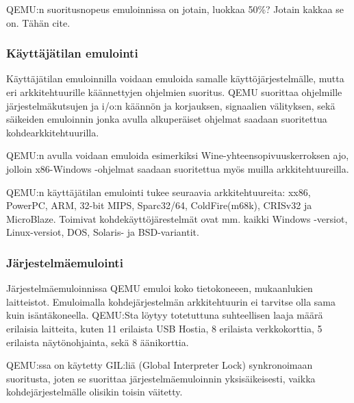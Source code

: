 QEMU:n suoritusnopeus emuloinnissa on jotain, luokkaa 50\%? Jotain kakkaa se on. Tähän cite. 

\subsubsection{Käyttäjätilan emulointi}
Käyttäjätilan emuloinnilla voidaan emuloida samalle käyttöjärjestelmälle, mutta eri arkkitehtuurille käännettyjen ohjelmien suoritus. QEMU suorittaa ohjelmille järjestelmäkutsujen ja i/o:n käännön ja korjauksen, signaalien välityksen, sekä säikeiden emuloinnin jonka avulla alkuperäiset ohjelmat saadaan suoritettua kohdearkkitehtuurilla.

QEMU:n avulla voidaan emuloida esimerkiksi Wine-yhteensopivuuskerroksen ajo, jolloin x86-Windows -ohjelmat saadaan suoritettua myös muilla arkkitehtuureilla.

QEMU:n käyttäjätilan emulointi tukee seuraavia arkkitehtuureita: xx86, PowerPC, ARM, 32-bit MIPS, Sparc32/64, ColdFire(m68k), CRISv32 ja MicroBlaze. Toimivat kohdekäyttöjärestelmät ovat mm. kaikki Windows -versiot, Linux-versiot, DOS, Solaris- ja BSD-variantit.


\subsubsection{Järjestelmäemulointi}
Järjestelmäemuloinnissa QEMU emuloi koko tietokoneeen, mukaanlukien laitteistot. Emuloimalla kohdejärjestelmän arkkitehtuurin ei tarvitse olla sama kuin isäntäkoneella. QEMU:Sta löytyy totetuttuna suhteellisen laaja määrä erilaisia laitteita, kuten 11 erilaista USB Hostia, 8 erilaista verkkokorttia, 5 erilaista näytönohjainta, sekä 8 äänikorttia.

QEMU:ssa on käytetty GIL:liä (Global Interpreter Lock) synkronoimaan suoritusta, joten se suorittaa järjestelmäemuloinnin yksisäikeisesti, vaikka kohdejärjestelmälle olisikin toisin väitetty. 


